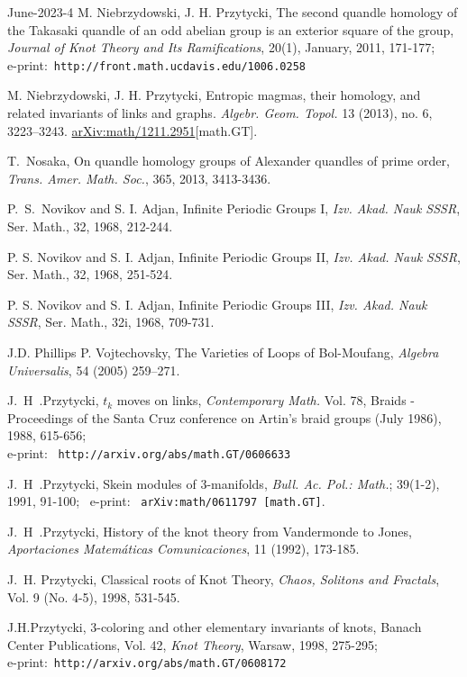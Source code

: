 \documentclass[12pt]{amsart}
\begin{document}
\begin{thebibliography}{June-2023-4}
  M. Niebrzydowski, J. H. Przytycki, 
The second quandle homology of the Takasaki quandle of an odd
abelian group is an exterior square of the group, {\it Journal of Knot Theory and Its Ramifications},
20(1), January, 2011, 171-177;\\
e-print:\ {\tt http://front.math.ucdavis.edu/1006.0258}

  M. Niebrzydowski, J. H. Przytycki,
Entropic magmas, their homology, and related invariants of links and graphs. {\it Algebr. Geom. Topol.} 13 (2013), no. 6, 3223–3243. \href{https://arxiv.org/abs/math/1211,2951}{arXiv:math/1211.2951}[math.GT].

T.~Nosaka, On quandle homology groups of Alexander quandles of prime order,
{\it Trans. Amer. Math. Soc.}, 365, 2013, 3413-3436.

 P.~S.~Novikov and S. I. Adjan, Infinite Periodic
Groups I, \textit{Izv. Akad. Nauk SSSR}, Ser. Math., 32, 1968, 212-244.

 P. S. Novikov and S. I. Adjan, Infinite Periodic
Groups II, \textit{Izv. Akad. Nauk SSSR}, Ser. Math., 32, 1968, 251-524.

 P. S. Novikov and S. I. Adjan, Infinite Periodic
Groups III, \textit{Izv. Akad. Nauk SSSR}, Ser. Math., 32i, 1968, 709-731.

 J.D. Phillips P. Vojtechovsky, The Varieties of Loops of Bol-Moufang, {\it Algebra Universalis}, 54 (2005) 259–271.

 J.~H~.Przytycki, 
$t_k$ moves on links, {\it Contemporary Math.}  Vol. 78,
Braids - Proceedings of the Santa
Cruz conference on Artin's braid groups (July 1986), 1988, 615-656;\\
e-print: \ {\tt http://arxiv.org/abs/math.GT/0606633}

 J.~H~.Przytycki,  Skein modules of 3-manifolds, {\it Bull. Ac. Pol.: Math.}; 39(1-2),
1991, 91-100; \
e-print: \ {\tt arXiv:math/0611797 [math.GT]}.

 J.~H~.Przytycki,
History of the knot theory from Vandermonde to Jones,
{\em Aportaciones Matem\'aticas Comunicaciones}, 11 (1992), 173-185.

J.~H. Przytycki, Classical roots of Knot Theory,
{\it Chaos, Solitons and Fractals}, Vol. 9 (No. 4-5), 1998, 531-545.

 J.H.Przytycki, 
3-coloring and other elementary invariants of knots, Banach Center
Publications, Vol. 42, {\it Knot Theory}, Warsaw, 1998, 275-295; \\
e-print:\  {\tt  http://arxiv.org/abs/math.GT/0608172}


\end{thebibliography}
\end{document}
